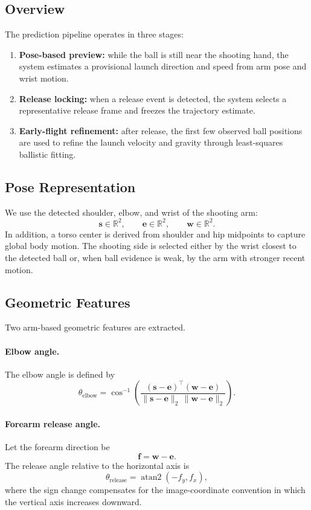 \documentclass[11pt]{article}
\begin{document}
\subsection{Overview}
The prediction pipeline operates in three stages:
\begin{enumerate}
    \item \textbf{Pose-based preview:} while the ball is still near the shooting hand, the system estimates a provisional launch direction and speed from arm pose and wrist motion.
    \item \textbf{Release locking:} when a release event is detected, the system selects a representative release frame and freezes the trajectory estimate.
    \item \textbf{Early-flight refinement:} after release, the first few observed ball positions are used to refine the launch velocity and gravity through least-squares ballistic fitting.
\end{enumerate}

\subsection{Pose Representation}
We use the detected shoulder, elbow, and wrist of the shooting arm:
\[
    \bm{s} \in \mathbb{R}^2, \qquad
    \bm{e} \in \mathbb{R}^2, \qquad
    \bm{w} \in \mathbb{R}^2.
\]
In addition, a torso center is derived from shoulder and hip midpoints to capture global body motion. The shooting side is selected either by the wrist closest to the detected ball or, when ball evidence is weak, by the arm with stronger recent motion.

\subsection{Geometric Features}
Two arm-based geometric features are extracted.

\paragraph{Elbow angle.}
The elbow angle is defined by
\begin{equation}
    \theta_{\text{elbow}}
    =
    \cos^{-1}
    \left(
    \frac{
    (\bm{s}-\bm{e})^\top (\bm{w}-\bm{e})
    }{
    \|\bm{s}-\bm{e}\|_2 \, \|\bm{w}-\bm{e}\|_2
    }
    \right).
\end{equation}

\paragraph{Forearm release angle.}
Let the forearm direction be
\begin{equation}
    \bm{f} = \bm{w} - \bm{e}.
\end{equation}
The release angle relative to the horizontal axis is
\begin{equation}
    \theta_{\text{release}} = \operatorname{atan2}(-f_y, f_x),
\end{equation}
where the sign change compensates for the image-coordinate convention in which the vertical axis increases downward.
\end{document}
